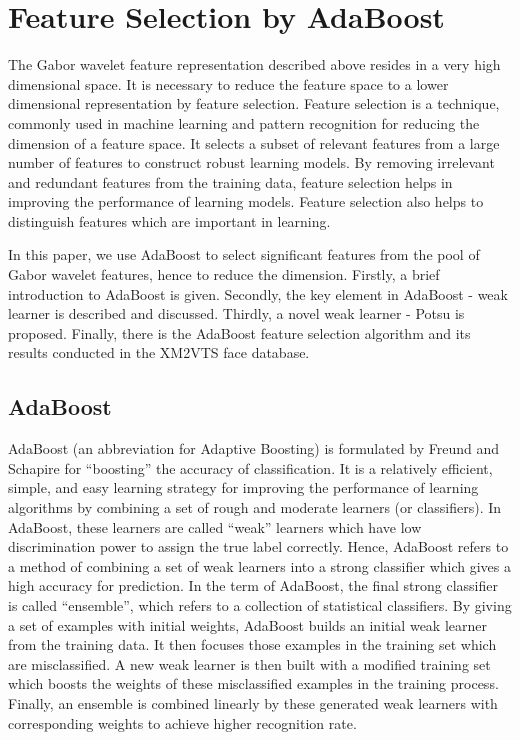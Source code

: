 \documentclass[a4paper,10pt]{article}
\begin{document}
\section{Feature Selection by AdaBoost}
\label{feature_selection}
The Gabor wavelet feature representation described above resides in a very high dimensional space. It is necessary to reduce the feature space to a lower dimensional representation by feature selection. Feature selection is a technique, commonly used in machine learning and pattern recognition for reducing the dimension of a feature space. It selects a subset of relevant features from a large number of features to construct robust learning models. By removing irrelevant and redundant features from the training data, feature selection helps in improving the performance of learning models. Feature selection also helps to distinguish features which are important in learning. 

In this paper, we use AdaBoost to select significant features from the pool of Gabor wavelet features, hence to reduce the dimension. Firstly, a brief introduction to AdaBoost is given. Secondly, the key element in AdaBoost - weak learner is described and discussed. Thirdly, a novel weak learner - Potsu is proposed. Finally, there is the AdaBoost feature selection algorithm and its results conducted in the \mbox{XM2VTS} face database.

\subsection{AdaBoost}
AdaBoost (an abbreviation for Adaptive Boosting) is formulated by Freund and Schapire \cite{Freund1995} for ``boosting'' the accuracy of classification. It is a relatively efficient, simple, and easy learning strategy for improving the performance of learning algorithms by combining a set of rough and moderate learners (or classifiers). In AdaBoost, these learners are called ``weak'' learners which have low discrimination power to assign the true label correctly. Hence, AdaBoost refers to a method of combining a set of weak learners into a strong classifier which gives a high accuracy for prediction. In the term of AdaBoost, the final strong classifier is called ``ensemble'', which refers to a collection of statistical classifiers. By giving a set of examples with initial weights, AdaBoost builds an initial weak learner from the training data. It then focuses those examples in the training set which are misclassified. A new weak learner is then built with a modified training set which boosts the weights of these misclassified examples in the training process. Finally, an ensemble is combined linearly by these generated weak learners with corresponding weights to achieve higher recognition rate.
\end{document}
